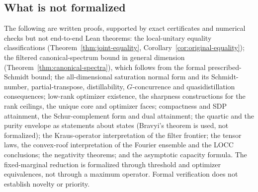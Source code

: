 \subsection{What is not formalized}
The following are written proofs, supported by exact certificates and
numerical checks but not end-to-end Lean theorems: the local-unitary equality
classifications (Theorem~\ref{thm:joint-equality},
Corollary~\ref{cor:original-equality}); the filtered canonical-spectrum bound
in general dimension (Theorem~\ref{thm:canonical-spectra}), which follows from
the formal prescribed-Schmidt bound; the all-dimensional saturation normal
form and its Schmidt-number, partial-transpose, distillability,
$G$-concurrence and quasidistillation consequences; low-rank optimizer
existence, the sharpness constructions for the rank ceilings, the unique core
and optimizer faces; compactness and SDP attainment, the Schur-complement
form and dual attainment; the quartic and the purity envelope as statements
about states (Bravyi's theorem is used, not formalized); the Kraus-operator
interpretation of the filter frontier; the tensor laws, the convex-roof
interpretation of the Fourier ensemble and the LOCC conclusions; the
negativity theorems; and the asymptotic capacity formula. The fixed-marginal
reduction is formalized through threshold and optimizer equivalences, not
through a maximum operator. Formal verification does not establish novelty
or priority.

